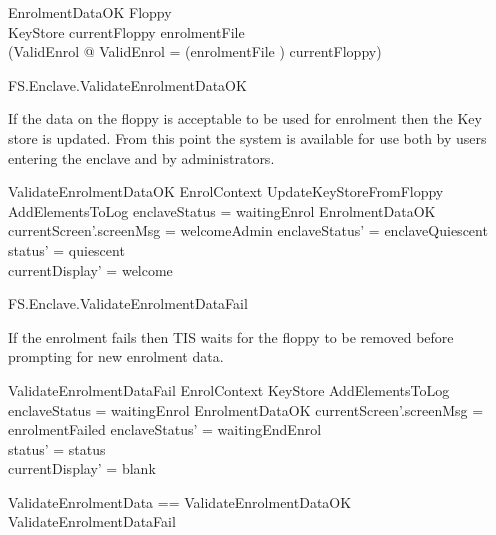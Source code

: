 \begin{schema}{EnrolmentDataOK}
        Floppy
\\      KeyStore
\where
        currentFloppy \in \ran enrolmentFile
\\      (\exists ValidEnrol @ \theta ValidEnrol = (enrolmentFile \inv) currentFloppy)
\end{schema}

\begin{traceunit}{FS.Enclave.ValidateEnrolmentDataOK}
\end{traceunit}


If the data on the floppy is acceptable to be used for enrolment then
the Key store is updated. From this point the system is available for
use both by users entering the enclave and by administrators.

\begin{schema}{ValidateEnrolmentDataOK}
        EnrolContext
\also
        UpdateKeyStoreFromFloppy
\\      AddElementsToLog
\where
        enclaveStatus = waitingEnrol
\also
        EnrolmentDataOK
\also
        currentScreen'.screenMsg = welcomeAdmin
\also
        enclaveStatus' = enclaveQuiescent 
\\      status' = quiescent
\\      currentDisplay' = welcome
\end{schema}

\begin{traceunit}{FS.Enclave.ValidateEnrolmentDataFail}
\end{traceunit}

If the enrolment fails then TIS waits for the floppy to be removed
before prompting for new enrolment data. 

\begin{schema}{ValidateEnrolmentDataFail}
        EnrolContext
\also
        \Xi KeyStore
\also
        AddElementsToLog
\where
        enclaveStatus = waitingEnrol
\also
        \lnot EnrolmentDataOK
\also
        currentScreen'.screenMsg = enrolmentFailed
\also
        enclaveStatus' = waitingEndEnrol
\\      status' = status
\\      currentDisplay' = blank
\end{schema}

\begin{zed}
        ValidateEnrolmentData == ValidateEnrolmentDataOK \lor
          ValidateEnrolmentDataFail
\end{zed}

